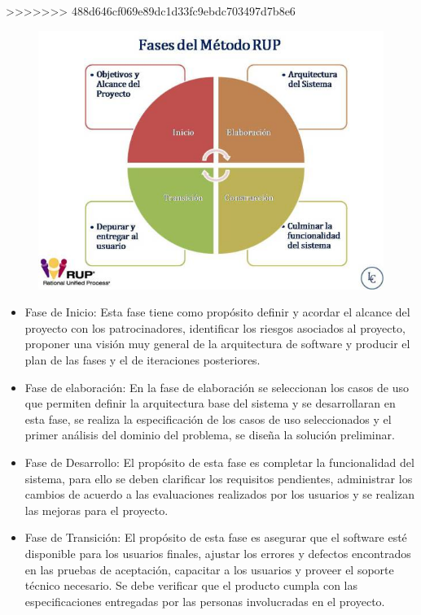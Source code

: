 >>>>>>> 488d646cf069e89dc1d33fc9ebdc703497d7b8e6
\begin{figure}[!htb]
	\includegraphics[width=\linewidth]{img/fases-rup.jpg}
	\endminipage\hfill
	
\end{figure}


\begin{itemize}

    \item Fase de Inicio: Esta fase tiene como propósito definir y acordar el alcance del proyecto con los patrocinadores, identificar los riesgos asociados al proyecto, proponer una visión muy general de la arquitectura de software y producir el plan de las fases y el de iteraciones posteriores.

	\item Fase de elaboración: En la fase de elaboración se seleccionan los casos de uso que permiten definir la arquitectura base del sistema y se desarrollaran en esta fase, se realiza la especificación de los casos de uso seleccionados y el primer análisis del dominio del problema, se diseña la solución preliminar.

	\item Fase de Desarrollo: El propósito de esta fase es completar la funcionalidad del sistema, para ello se deben clarificar los requisitos pendientes, administrar los cambios de acuerdo a las evaluaciones realizados por los usuarios y se realizan las mejoras para el proyecto.

	\item Fase de Transición: El propósito de esta fase es asegurar que el software esté disponible para los usuarios finales, ajustar los errores y defectos encontrados en las pruebas de aceptación, capacitar a los usuarios y proveer el soporte técnico necesario. Se debe verificar que el producto cumpla con las especificaciones entregadas por las personas involucradas en el proyecto.	

\end{itemize}
